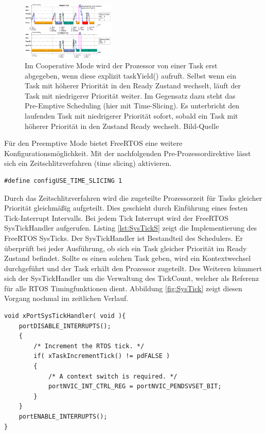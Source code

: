 \begin{figure}[htb]
	\centering
		\includegraphics[width=0.4\textwidth]{Pictures/EMCUIT/PreemptiveCooperative.png}
	\caption{Im Cooperative Mode wird der Prozessor von einer Task erst abgegeben, wenn diese explizit taskYield() aufruft. Selbst wenn ein Task mit höherer Priorität in den Ready Zustand wechselt, läuft der Task mit niedrigerer Priorität weiter. Im Gegensatz dazu steht das Pre-Emptive Scheduling (hier mit Time-Slicing). Es unterbricht den laufenden Task mit niedrigerer Priorität sofort, sobald ein Task mit höherer Priorität in den Zustand Ready wechselt. Bild-Quelle~\protect{}}
	\label{fig:PreVSCo}
\end{figure}
Für den Preemptive Mode bietet FreeRTOS eine weitere Konfigurationsmöglichkeit. Mit der nachfolgenden Pre-Prozessordirektive lässt sich ein Zeitschlitzverfahren (time slicing) aktivieren. 
\begin{lstlisting}[numbers = none]
#define configUSE_TIME_SLICING 1
\end{lstlisting}
Durch das Zeitschlitzverfahren wird die zugeteilte Prozessorzeit für Tasks gleicher Priorität gleichmäßig aufgeteilt. Dies geschieht durch Ein\-füh\-rung eines festen Tick-Interrupt Intervalls. Bei jedem Tick Interrupt wird der FreeRTOS SysTickHandler aufgerufen. Listing \ref{lst:SysTickS} zeigt die Implementierung des FreeRTOS SysTicks. Der SysTickHandler ist Bestandteil des Schedulers. Er überprüft bei jeder Ausführung, ob sich ein Task gleicher Priorität im Ready Zustand befindet. Sollte es einen solchen Task geben, wird ein Kontextwechsel durchgeführt und der Task erhält den Prozessor zugeteilt. Des Weiteren kümmert sich der SysTickHandler um die Verwaltung des TickCount, welcher als Referenz für alle RTOS Timingfunktionen dient. Abbildung \ref{fig:SysTick} zeigt diesen Vorgang nochmal im zeitlichen Verlauf. 
\begin{lstlisting}[caption={FreeRTOS Source des SysTickHandlers aus Task.c. Der SysTickHandler verwaltet den TickCount. Der TickCount dient allen Timingfunktionen des RTOS Kernels als Zeitreferenz. Des Weiteren wird beim aktiven Time Slicing überprüft ob ein Kontextwechsel nötig ist. Der Kontextwechsel wird dann ggf. durch den PendSVHandler durchgeführt.}, linewidth=8cm,captionpos=b, label=lst:SysTickS, float=hbt]
void xPortSysTickHandler( void ){
	portDISABLE_INTERRUPTS();
	{
		/* Increment the RTOS tick. */
		if( xTaskIncrementTick() != pdFALSE )
		{
			/* A context switch is required. */
			portNVIC_INT_CTRL_REG = portNVIC_PENDSVSET_BIT;
		}
	}
	portENABLE_INTERRUPTS();
}
\end{lstlisting}
